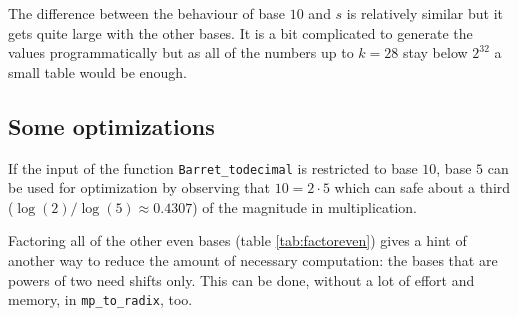 \documentclass[a4paper,10pt]{article}
\theoremstyle{plain} %
\theoremstyle{definition}
\theoremstyle{remark}
\newcommand*{\smalltt}[1]{\small\texttt{#1}}
\begin{document}
The difference between the behaviour of base $10$ and $s$ is relatively similar but it gets quite large with the other bases. It is a bit complicated to generate the values programmatically but as all of the numbers up to $k=28$ stay below $2^{32}$ a small table would be enough.

\subsection{Some optimizations}\label{subsec:optimizations}

If the input of the function \smalltt{Barret\_todecimal} is restricted to base $10$, base $5$ can be used for optimization by observing that $10 = 2\cdot5$ which can safe about a third ($\log(2)/\log(5) \approx 0.4307$) of the magnitude in multiplication.

Factoring all of the other even bases (table \ref{tab:factoreven}) gives a hint of another way to reduce the amount of necessary computation: the bases that are powers of two need shifts only. This can be done, without a lot of effort and memory, in \smalltt{mp\_to\_radix}, too.
\end{document}
